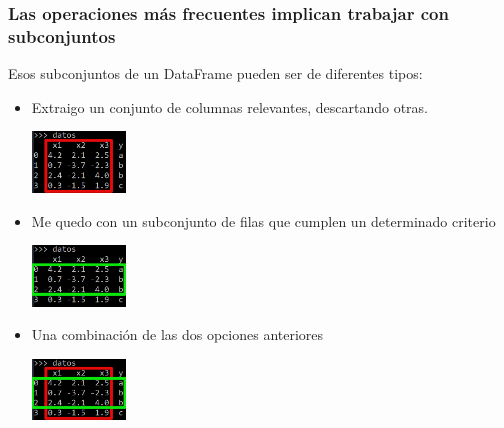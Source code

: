 \documentclass[9pt]{beamer}
\begin{document}
\begin{frame}[fragile]
  \frametitle{Las operaciones más frecuentes implican trabajar con subconjuntos}
  \begin{block}{}
Esos subconjuntos de un DataFrame pueden ser de diferentes tipos:
    \begin{itemize}
    \item {\footnotesize Extraigo un conjunto de columnas relevantes, descartando otras.}
      \begin{center}
        \includegraphics[width=2.5cm]{seleccionar_columnas}
      \end{center}
    \item {\footnotesize Me quedo con un subconjunto de filas que cumplen un determinado criterio}
      \begin{center}
        \includegraphics[width=2.5cm]{seleccionar_filas}
      \end{center}
    \item {\footnotesize Una combinación de las dos opciones anteriores}
      \begin{center}
        \includegraphics[width=2.5cm]{seleccionar_columnas_filas}
      \end{center}
    \end{itemize}
  \end{block}
    \end{frame}
\end{document}

